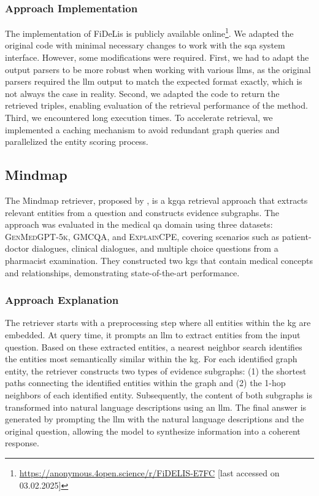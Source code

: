 \subsubsection{Approach Implementation} 
The implementation of FiDeLis is publicly available online\footnote{\url{https://anonymous.4open.science/r/FiDELIS-E7FC} [last accessed on 03.02.2025]}. We adapted the original code with minimal necessary changes to work with the \gls{sqa} system interface. However, some modifications were required. First, we had to adapt the output parsers to be more robust when working with various \glspl{llm}, as the original parsers required the \gls{llm} output to match the expected format exactly, which is not always the case in reality. Second, we adapted the code to return the retrieved triples, enabling evaluation of the retrieval performance of the method. Third, we encountered long execution times. To accelerate retrieval, we implemented a caching mechanism to avoid redundant graph queries and parallelized the entity scoring process.

\subsection{Mindmap}
The Mindmap retriever, proposed by \textcite{wen_mindmap_2024}, is a \gls{kgqa} retrieval approach that extracts relevant entities from a question and constructs evidence subgraphs. The approach was evaluated in the medical \gls{qa} domain using three datasets: \textsc{GenMedGPT-5k}, \textsc{GMCQA}, and \textsc{ExplainCPE}, covering scenarios such as patient-doctor dialogues, clinical dialogues, and multiple choice questions from a pharmacist examination. They constructed two \glspl{kg} that contain medical concepts and relationships, demonstrating state-of-the-art performance.


\subsubsection{Approach Explanation} 
The retriever starts with a preprocessing step where all entities within the \gls{kg} are embedded. At query time, it prompts an \gls{llm} to extract entities from the input question. Based on these extracted entities, a nearest neighbor search identifies the entities most semantically similar within the \gls{kg}. For each identified graph entity, the retriever constructs two types of evidence subgraphs: (1) the shortest paths connecting the identified entities within the graph and (2) the 1-hop neighbors of each identified entity. Subsequently, the content of both subgraphs is transformed into natural language descriptions using an \gls{llm}. The final answer is generated by prompting the \gls{llm} with the natural language descriptions and the original question, allowing the model to synthesize information into a coherent response.

